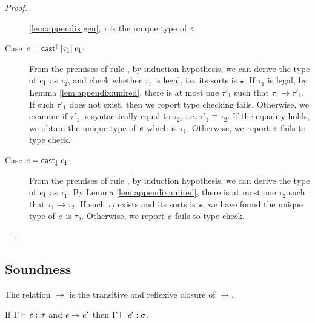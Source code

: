 \begin{proof}
\begin{description}
\ref{lem:appendix:gen}, $\tau$ is the unique type of $\mathit{e}$.
		\item[Case $\mathit{e}=\mathsf{cast}^{\uparrow} \, [  \tau_{{\mathrm{1}}}  ] \,  \mathit{e_{{\mathrm{1}}}}$:] From the premises of rule
, by induction hypothesis, we can derive the type of
$\mathit{e_{{\mathrm{1}}}}$ as $\tau_{{\mathrm{2}}}$, and check whether $\tau_{{\mathrm{1}}}$ is legal, i.e. its sorts is
$\star$. If $\tau_{{\mathrm{1}}}$ is legal, by Lemma \ref{lem:appendix:unired}, there is
at most one $\tau'_{{\mathrm{1}}}$ such that $\tau_{{\mathrm{1}}}  \longrightarrow  \tau'_{{\mathrm{1}}}$. If such $\tau'_{{\mathrm{1}}}$ does not
exist, then we report type checking fails. Otherwise, we examine if $\tau'_{{\mathrm{1}}}$
is syntactically equal to $\tau_{{\mathrm{2}}}$, i.e. $\tau'_{{\mathrm{1}}}  \equiv  \tau_{{\mathrm{2}}}$. If the equality
holds, we obtain the unique type of $\mathit{e}$ which is $\tau_{{\mathrm{1}}}$. Otherwise, we
report $\mathit{e}$ fails to type check.
		\item[Case $\mathit{e}=\mathsf{cast}_{\downarrow} \, \mathit{e_{{\mathrm{1}}}}$:] From the premises of rule
, by induction hypothesis, we can derive the type of
$\mathit{e_{{\mathrm{1}}}}$ as $\tau_{{\mathrm{1}}}$. By Lemma \ref{lem:appendix:unired}, there is at most one
$\tau_{{\mathrm{2}}}$ such that $\tau_{{\mathrm{1}}}  \longrightarrow  \tau_{{\mathrm{2}}}$. If such $\tau_{{\mathrm{2}}}$ exists and its sorts is
$\star$, we have found the unique type of $\mathit{e}$ is $\tau_{{\mathrm{2}}}$. Otherwise, we
report $\mathit{e}$ fails to type check.
	\end{description}
\end{proof}

\subsection{Soundness}
\begin{dfn}
    The relation $ \twoheadrightarrow $ is the transitive and reflexive closure of
$ \longrightarrow $.
\end{dfn}

\begin{thm}
If $\Gamma  \vdash  \mathit{e}  :  \sigma$ and $\mathit{e}  \twoheadrightarrow  e'$ then $\Gamma  \vdash  \mathit{e'}  :  \sigma$.
\end{thm}

